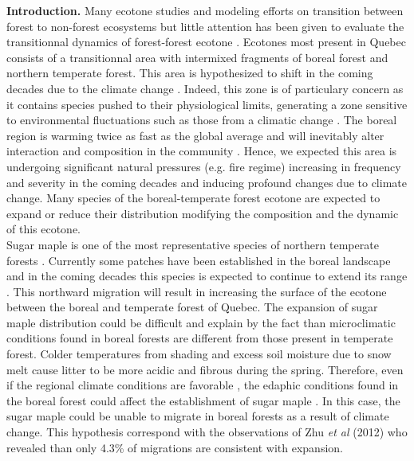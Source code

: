 


\newpage
\setcounter{page}{1}
\textbf{Introduction.} Many ecotone studies and modeling efforts on transition between forest to non-forest ecosystems \cite{Scheffer2012,Scheffer2001,Hirota2011} but little attention has been given to evaluate the transitionnal dynamics of forest-forest ecotone \cite{Goldblum2010,Graignic2013}. Ecotones most present in Quebec consists of a transitionnal area with intermixed fragments of boreal forest and northern temperate forest\cite{Goldblum2010}. This area is hypothesized to shift in the coming decades due to the climate change \cite{Scheffer2012}. Indeed, this zone is of particulary concern as it contains species pushed to their physiological limits, generating a zone sensitive to environmental fluctuations such as those from a climatic change \cite{Messaoud2007,Goldblum2010}. The boreal region is warming twice as fast as the global average and will inevitably alter interaction and composition in the community \cite{Scheffer2012,Hughes2000}. Hence, we expected  this area is undergoing significant natural pressures (e.g. fire regime) increasing in frequency and severity in the coming decades and inducing profound changes due to climate change. Many species of the boreal-temperate forest ecotone are expected to expand or reduce their distribution \cite{Graignic2013,Goldblum2005,Hughes2000} modifying the composition and the dynamic of this ecotone.\\

 Sugar maple is one of the most representative species of northern temperate forests \cite{Graignic2013,Messaoud2007,Kellman2004}. Currently some patches have been established in the boreal landscape  and in the coming decades this species is expected to continue to extend its range \cite{Graignic2013,Goldblum2005,Woodall2009}. This northward migration will result in increasing the surface of the ecotone between the boreal and temperate forest of Quebec. The expansion of sugar maple distribution could be difficult and explain by the fact than microclimatic conditions found in boreal forests are different from those present in temperate forest. Colder temperatures from shading and excess soil moisture due to snow melt cause litter to be more acidic and fibrous during the spring. Therefore, even if the regional climate conditions are favorable \cite{Kellman2004}, the edaphic conditions found in the boreal forest could affect the establishment of sugar maple \cite{Kellman2004,Moore2008}. In this case, the sugar maple could be unable to migrate in boreal forests as a result of climate change. This hypothesis correspond with the observations of Zhu \emph{et al} (2012) who revealed than only 4.3\% of migrations are consistent with expansion\cite{Zhu2012}.\\

